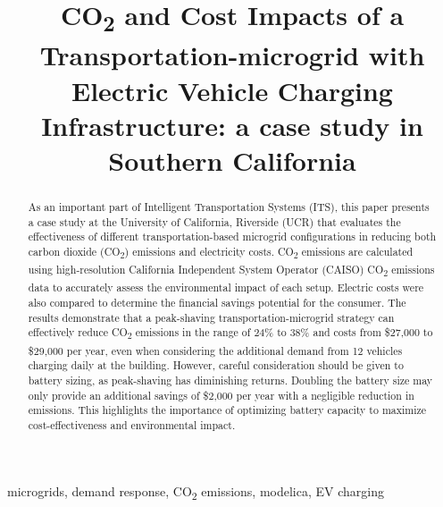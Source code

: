 \documentclass[conference]{IEEEtran}
\begin{document}
\title{CO\textsubscript{2} and Cost Impacts of a Transportation-microgrid with Electric Vehicle Charging Infrastructure: a case study in Southern California}

\author{
}
\maketitle

\begin{abstract}
	As an important part of Intelligent Transportation Systems (ITS), this paper presents a case study at the University of California, Riverside (UCR) that evaluates the effectiveness of different transportation-based microgrid configurations in reducing both carbon dioxide (CO\textsubscript{2}) emissions and electricity costs. CO\textsubscript{2} emissions are calculated using high-resolution California Independent System Operator (CAISO) CO\textsubscript{2} emissions data to accurately assess the environmental impact of each setup. Electric costs were also compared to determine the financial savings potential for the consumer. The results demonstrate that a peak-shaving transportation-microgrid strategy can effectively reduce CO\textsubscript{2} emissions in the range of 24\% to 38\% and costs from \$27,000 to \$29,000 per year, even when considering the additional demand from 12 vehicles charging daily at the building. However, careful consideration should be given to battery sizing, as peak-shaving has diminishing returns. Doubling the battery size may only provide an additional savings of \$2,000 per year with a negligible reduction in emissions. This highlights the importance of optimizing battery capacity to maximize cost-effectiveness and environmental impact.
\end{abstract}
\begin{IEEEkeywords}
microgrids, demand response, CO\textsubscript{2} emissions, modelica, EV charging
\end{IEEEkeywords}
\end{document}
